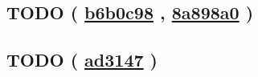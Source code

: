 \documentclass{article}
\newcommand{\gh}[1]{%
  \href{https://github.com/awave1/assessment-loan-system/commit/#1}{#1}%
}
\begin{document}





\subsection*{TODO (\gh{b6b0c98}, \gh{8a898a0})}






\subsection*{TODO (\gh{ad3147})}
\end{document}
